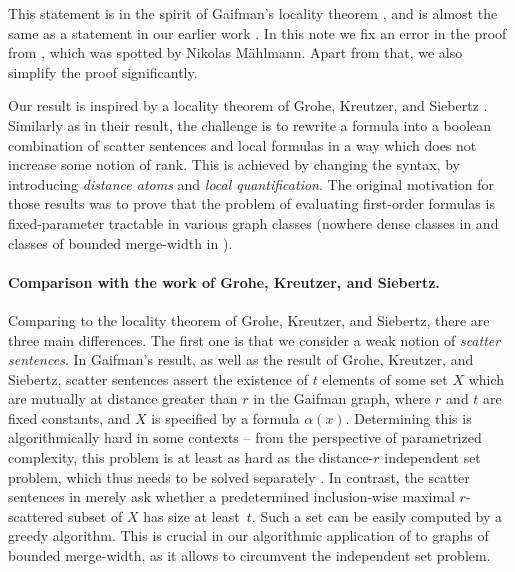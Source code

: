 \documentclass[11pt]{article}
\theoremstyle{remark}
\begin{document}
This statement is in the spirit of Gaifman's locality theorem \cite{gaifman},
and is 
almost the same as a statement in our earlier work \cite[Theorem 4.1]{mw-stoc,mw-arxiv-v1}.
In this note we fix an error in the proof from \cite{mw-arxiv-v1}, which was spotted by Nikolas M\"ahlmann. Apart from that, we also simplify the proof significantly.

Our result is inspired by a locality theorem of Grohe, Kreutzer, and Siebertz  \cite{gks}.
Similarly as in their result, the challenge is to 
rewrite a formula into a boolean combination of scatter sentences and local formulas in a way which does not increase some notion of rank. 
This is achieved by changing the syntax, by introducing \emph{distance atoms} and \emph{local quantification}.
The original motivation for those results was to prove that 
the problem of evaluating first-order formulas is fixed-parameter tractable in various graph classes (nowhere dense classes in \cite{gks} and classes of bounded merge-width in \cite{mw-stoc}).


\paragraph{Comparison with the work of Grohe, Kreutzer, and Siebertz.}
Comparing  to the locality theorem  \cite[Theorem 7.5]{gks} of Grohe, Kreutzer, and Siebertz, there are three main differences.
The first one is that we consider a weak notion of \emph{scatter sentences}. In Gaifman's result, as well as the result of Grohe, Kreutzer, and Siebertz, scatter sentences assert the existence of $t$ elements 
of some set $X$ which are mutually at distance greater than $r$ in the Gaifman graph, where $r$ and $t$ are fixed constants, and $X$ is specified by a formula $\alpha(x)$. Determining this is algorithmically hard in some contexts -- from the perspective of parametrized complexity, this problem is at least as hard as the distance-$r$ independent set problem, which thus needs to be solved separately \cite[Theorem 5.1]{gks}.
 In contrast, the scatter sentences in  
merely ask whether a predetermined inclusion-wise maximal $r$-scattered subset of $X$ has size at least~$t$. Such a set can be easily computed by a greedy algorithm. This is crucial in our algorithmic application of  to graphs of bounded merge-width, as it allows to circumvent the independent set problem.
\end{document}
